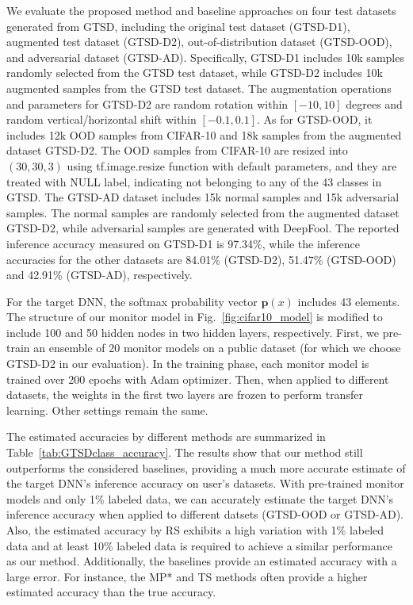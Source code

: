 \documentclass{article}
\newcommand{\monitorModel}{monitor model\xspace}
\begin{document}
We evaluate the proposed method and baseline approaches on four test datasets generated from GTSD, including the original test dataset (GTSD-D1), augmented test dataset (GTSD-D2), out-of-distribution dataset (GTSD-OOD), and adversarial dataset (GTSD-AD). Specifically, GTSD-D1 includes 10k samples randomly selected from the GTSD test dataset, while GTSD-D2 includes 10k augmented samples from the GTSD test dataset. The augmentation operations and parameters for GTSD-D2 are random rotation within $[-10,10]$ degrees and random vertical/horizontal shift within $[-0.1,0.1]$. As for GTSD-OOD, it includes 12k OOD samples from CIFAR-10 and 18k samples from the augmented dataset GTSD-D2. The OOD samples from CIFAR-10 are resized into $(30,30,3)$ using tf.image.resize function with default parameters, and they are treated with NULL label, indicating not belonging to any of the 43 classes in GTSD. The GTSD-AD dataset includes 15k normal samples and 15k adversarial samples. The normal samples are randomly selected from the augmented dataset GTSD-D2, while adversarial samples are generated with DeepFool. The reported inference accuracy measured on GTSD-D1 is 97.34\%, while the inference accuracies for the other datasets are 84.01\% (GTSD-D2), 51.47\% (GTSD-OOD) and 42.91\% (GTSD-AD), respectively.

For the target DNN, the softmax probability vector $\mathbf{p}(x)$ includes 43 elements. The structure of our monitor model in Fig.~\ref{fig:cifar10_model} is modified to
include 100 and 50 hidden nodes in two hidden layers, respectively. First, we pre-train an ensemble of 20 monitor models on a public dataset (for which we choose GTSD-D2 in our evaluation). In the training phase, each \monitorModel is trained over 200 epochs with Adam optimizer. Then, when applied to different datasets, the weights in the first two layers are frozen to perform transfer learning. Other settings remain the same.

The estimated accuracies by different methods  are summarized in Table~\ref{tab:GTSDclass_accuracy}. The results show that our method still outperforms
the considered baselines, providing a much more accurate estimate of the target DNN's inference accuracy on user's datasets. With pre-trained monitor models and only 1\% labeled data, we can accurately estimate the target DNN's inference accuracy when applied to different datsets (GTSD-OOD or GTSD-AD). Also, the estimated accuracy by RS exhibits a high variation with 1\% labeled data and at least 10\% labeled data is required to achieve a similar performance as our method. Additionally, the baselines provide an estimated accuracy with a large error. For instance, the MP* and TS methods often provide a higher estimated accuracy than the true accuracy.
\end{document}
